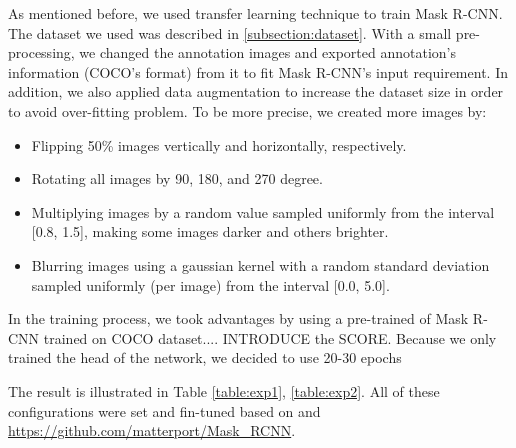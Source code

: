 	As mentioned before, we used transfer learning technique to train Mask R-CNN. The dataset we used was described in \ref{subsection:dataset}. With a small pre-processing, we changed the annotation images and exported annotation's information (COCO's format) from it to fit Mask R-CNN's input requirement. In addition, we also applied data augmentation to increase the dataset size in order to avoid over-fitting problem. To be more precise, we created more images by:
	
	\begin{itemize}
		\item Flipping 50\% images vertically and horizontally, respectively.
		\item Rotating all images by 90, 180, and 270 degree.
		\item Multiplying images by a random value sampled uniformly from the interval [0.8, 1.5], making some images darker and others brighter.
		\item Blurring images using a gaussian kernel with a random standard deviation sampled uniformly (per image) from the interval [0.0, 5.0].
	\end{itemize}
	
	In the training process, we took advantages by using a pre-trained of Mask R-CNN trained on COCO dataset.... INTRODUCE the SCORE. Because we only trained the head of the network, we decided to use 20-30 epochs
	
	
	The result is illustrated in Table \ref{table:exp1}, \ref{table:exp2}. All of these configurations were set and fin-tuned based on \cite{maskrcnn} and \url{https://github.com/matterport/Mask_RCNN}.
	

